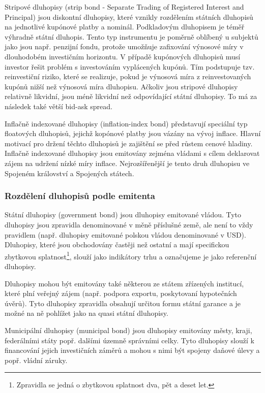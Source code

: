 \documentclass[a4paper]{book}
\begin{document}
Stripové dluhopisy (strip bond - Separate Trading of Registered Interest and Principal) jsou diskontní dluhopisy, které vznikly rozdělením státních dluhopisů na jednotlivé kupónové platby a nominál. Podkladovým dluhopisem je téměř výhradně státní dluhopis. Tento typ instrumentu je poměrně oblíbený u subjektů jako jsou např. penzijní fondu, protože umožňuje zafixování výnosové míry v dlouhodobém investičním horizontu. V případě kupónových dluhopisů musí investor řešit problém s investováním vyplácených kupónů. Tím podstupuje tzv. reinvestiční riziko, které se realizuje, pokud je výnosová míra z reinvestovaných kupónů nižší než výnosová míra dluhopisu. Ačkoliv jsou stripové dluhopisy relativně likvidní, jsou méně likvidní než odpovídající státní dluhopisy. To má za následek také větší bid-ask spread.

Inflačně indexované dluhopisy (inflation-index bond) představují speciální typ floatových dluhopisů, jejichž kopónové platby jsou vázány na vývoj inflace. Hlavní motivací pro držení těchto dluhopisů je zajištění se před růstem cenové hladiny. Inflačně indexované dluhopisy jsou emitovány zejména vládami s cílem deklarovat zájem na udržení nízké míry inflace. Nejrozšířenější je tento druh dluhopisu ve Spojeném království a Spojených státech.

\subsubsection{Rozdělení dluhopisů podle emitenta}

Státní dluhopisy (government bond) jsou dluhopisy emitované vládou. Tyto dluhopisy jsou zpravidla denominované v měně příslušné země, ale není to vždy pravidlem (např. dluhopisy emitované polskou vládou denominované v USD). Dluhopisy, které jsou obchodovány častěji než ostatní a mají specifickou zbytkovou splatnost\footnote{Zpravidla se jedná o zbytkovou splatnost dva, pět a deset let.}, slouží jako indikátory trhu a označujeme je jako referenční dluhopisy.

Dluhopisy mohou být emitovány také některou ze státem zřízených institucí, které plní veřejný zájem (např. podpora exportu, poskytovaní hypotečních úvěrů). Tyto dluhopisy zpravidla obsahují určitou formu státní garance a je možné na ně pohlížet jako na quasi státní dluhopisy.

Municipální dluhopisy (municipal bond) jsou dluhopisy emitovány městy, kraji, federálními státy popř. dalšími územně správními celky. Tyto dluhopisy slouží k financování jejich investičních záměrů a mohou s nimi být spojeny daňové úlevy a popř. vládní záruky.
\end{document}

